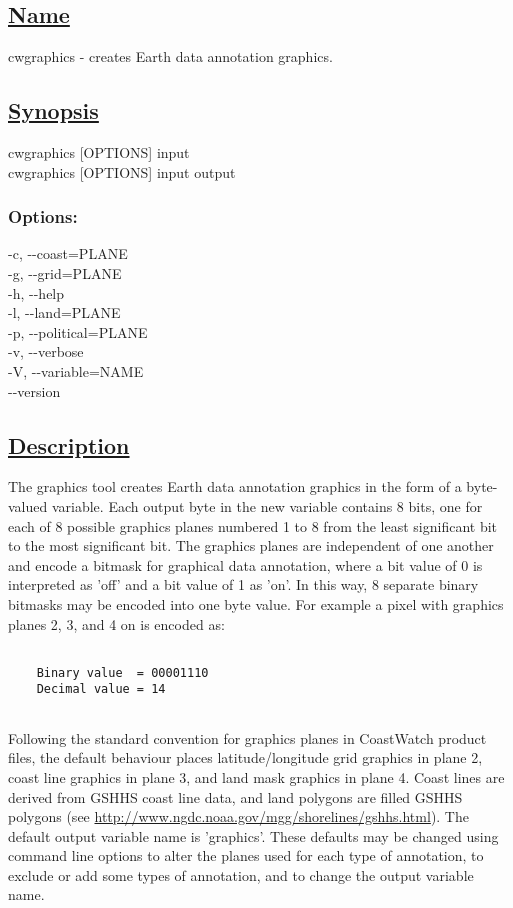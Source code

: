 \subsection*{\underline{Name}}


   cwgraphics - creates Earth data annotation graphics.  
\subsection*{\underline{Synopsis}}


  cwgraphics [OPTIONS] input \\ 
 cwgraphics [OPTIONS] input output 
\subsubsection*{Options:}


  -c, -{-}coast=PLANE \\ 
 -g, -{-}grid=PLANE \\ 
 -h, -{-}help \\ 
 -l, -{-}land=PLANE \\ 
 -p, -{-}political=PLANE \\ 
 -v, -{-}verbose \\ 
 -V, -{-}variable=NAME \\ 
 -{-}version \\ 

\subsection*{\underline{Description}}


  The graphics tool creates Earth data annotation graphics in the form of a byte-valued variable. Each output byte in the new variable contains 8 bits, one for each of 8 possible graphics planes numbered 1 to 8 from the least significant bit to the most significant bit. The graphics planes are independent of one another and encode a bitmask for graphical data annotation, where a bit value of 0 is interpreted as 'off' and a bit value of 1 as 'on'. In this way, 8 separate binary bitmasks may be encoded into one byte value. For example a pixel with graphics planes 2, 3, and 4 on is encoded as: \begin{verbatim}

    Binary value  = 00001110
    Decimal value = 14
 
\end{verbatim}
 Following the standard convention for graphics planes in CoastWatch product files, the default behaviour places latitude/longitude grid graphics in plane 2, coast line graphics in plane 3, and land mask graphics in plane 4. Coast lines are derived from GSHHS coast line data, and land polygons are filled GSHHS polygons (see \url{http://www.ngdc.noaa.gov/mgg/shorelines/gshhs.html}). The default output variable name is 'graphics'. These defaults may be changed using command line options to alter the planes used for each type of annotation, to exclude or add some types of annotation, and to change the output variable name.


